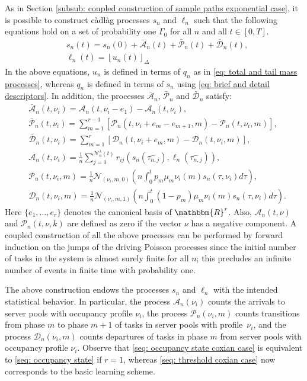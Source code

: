\documentclass[a4paper, 12pt]{article}
\theoremstyle{definition}
\newcommand{\floor}[1]{\left\lfloor#1\right\rfloor}
\newcommand{\calA}{\mathcal{A}}
\newcommand{\calD}{\mathcal{D}}
\newcommand{\calN}{\mathcal{N}}
\newcommand{\calP}{\mathcal{P}}
\newcommand{\R}{\mathbbm{R}}
\begin{document}
As in Section \ref{subsub: coupled construction of sample paths exponential case}, it is possible to construct c\`adl\`ag processes $s_n$ and $\ell_n$ such that the following equations hold on a set of probability one $\Gamma_0$ for all $n$ and all $t \in [0, T]$.
\begin{subequations}
	\begin{align}
		&s_n(t) = s_n(0) + \bar{\calA}_n(t) + \bar{\calP}_n(t) + \bar{\calD}_n(t), \label{seq: occupancy state coxian case}\\
		&\ell_n(t) = \floor{u_n(t)}_\Delta \label{seq: threshold coxian case}
	\end{align}
\end{subequations}
In the above equations, $u_n$ is defined in terms of $q_n$ as in \eqref{eq: total and tail mass processes}, whereas $q_n$ is defined in terms of $s_n$ using \eqref{eq: brief and detail descriptors}. In addition, the processes $\bar{\calA}_n$, $\bar{\calP}_n$ and $\bar{\calD}_n$ satisfy:
\begin{align*}
	&\bar{\calA}_n(t, \nu_i) = \calA_n(t, \nu_i - e_1) - \calA_n(t, \nu_i), \\
	&\bar{\calP}_n(t, \nu_i) = \sum_{m = 1}^{r - 1} \left[\calP_n(t, \nu_i + e_m - e_{m + 1}, m) - \calP_n(t, \nu_i, m)\right], \\
	&\bar{\calD}_n(t, \nu_i) = \sum_{m = 1}^r \left[\calD_n(t, \nu_i + e_m, m) -\calD_n(t, \nu_i, m)\right], \\
	&\calA_n(t, \nu_i) = \frac{1}{n} \sum_{j = 1}^{\calN_n^\lambda(t)} r_{ij}\left(s_n\left(\tau_{n, j}^-\right), \ell_n\left(\tau_{n, j}^-\right)\right), \\
	&\calP_n(t, \nu_i, m) = \frac{1}{n} \calN_{(\nu_i, m, 0)} \left(n\int_0^t p_m\mu_m\nu_i(m)s_n(\tau, \nu_i)d\tau\right), \\
	&\calD_n(t, \nu_i, m) = \frac{1}{n} \calN_{(\nu_i, m, 1)} \left(n\int_0^t (1 - p_m)\mu_m\nu_i(m)s_n(\tau, \nu_i)d\tau\right).
\end{align*}
Here $\{e_1, \dots, e_r\}$ denotes the canonical basis of $\R^r$. Also, $\calA_n(t, \nu)$ and $\calP_n(t, \nu, k)$ are defined as zero if the vector $\nu$ has a negative component. A coupled construction of all the above processes can be performed by forward induction on the jumps of the driving Poisson processes since the initial number of tasks in the system is almost surely finite for all $n$; this precludes an infinite number of events in finite time with probability one.

The above construction endows the processes $s_n$ and $\ell_n$ with the intended statistical behavior. In particular, the process $\calA_n(\nu_i)$ counts the arrivals to server pools with occupancy profile $\nu_i$, the process $\calP_n(\nu_i, m)$ counts transitions from phase $m$ to phase $m + 1$ of tasks in server pools with profile~$\nu_i$, and the process $\calD_n(\nu_i, m)$ counts departures of tasks in phase $m$ from server pools with occupancy profile $\nu_i$. Observe that \eqref{seq: occupancy state coxian case} is equivalent to \eqref{seq: occupancy state} if $r = 1$, whereas \eqref{seq: threshold coxian case} now corresponds to the basic learning scheme.
\end{document}
